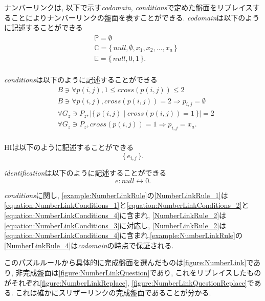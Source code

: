 \begin{example}[ナンバーリンクの数学的記述]
  ナンバーリンクは, 以下で示す\textit{codomain}, \textit{conditions}で定めた盤面をリプレイスすることによりナンバーリンクの盤面を表すことができる.
  \textit{codomain}は以下のように記述することができる
  \begin{align}
     & \mathbb{P}=\emptyset                                             \\
     & \mathbb{C}=\{\,\textit{null}, \emptyset ,x_1,x_2,\ldots, x_a\,\} \\
     & \mathbb{E}=\{\,\textit{null},0,1\,\}          .                  \\
  \end{align}

  \textit{conditions}は以下のように記述することができる
  \begin{align}
     & B\ni \forall p(i,j),1\le \textit{cross}(p(i,j))\le 2                          \label{equation:NumberLinkConditions_1} \\
     & B\ni \forall p(i,j), \textit{cross}(p(i,j))= 2 \Rightarrow p_{i,j}=\emptyset \label{equation:NumberLinkConditions_2}  \\
     & \forall G_z\ni P_z, |\{\,p(i,j)\mid cross(p(i,j))=1\,\}|=2             \label{equation:NumberLinkConditions_3}        \\
     & \forall G_z\ni P_z, \textit{cross}(p(i,j))= 1 \Rightarrow p_{i,j}=x_a     \label{equation:NumberLinkConditions_4} .   \\
  \end{align}

  HIは以下のように記述することができる
  \begin{equation}
    \{\,e_{i,j}\,\}.
  \end{equation}

  \textit{identification}は以下のように記述することができる
  \begin{equation}
    e:\textit{null}\leftrightarrow 0.
  \end{equation}

  \textit{conditions}に関し, \cref{example:NumberLinkRule}の\ref{NumberLinkRule_1}は\cref{equation:NumberLinkConditions_1}と\cref{equation:NumberLinkConditions_2}と\cref{equation:NumberLinkConditions_4}に含まれ, \ref{NumberLinkRule_2}は\cref{equation:NumberLinkConditions_3}に対応し, \ref{NumberLinkRule_2}は\cref{equation:NumberLinkConditions_4}に含まれ,\cref{example:NumberLinkRule}の\ref{NumberLinkRule_4}は\textit{codomain}の時点で保証される.

  このパズルルールから具体的に完成盤面を選んだものは\cref{figure:NumberLink}であり, 非完成盤面は\cref{figure:NumberLinkQuestion}であり, これをリプレイスしたものがそれぞれ\cref{figure:NumberLinkReplace}, \cref{figure:NumberLinkQuestionReplace}である. これは確かにスリザーリンクの完成盤面であることが分かる.
\end{example}

